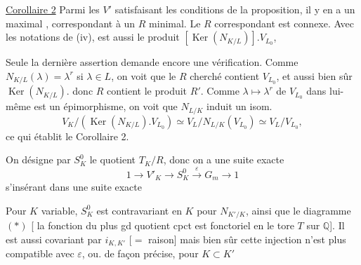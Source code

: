 \uline{Corollaire 2} Parmi les $V'$ satisfaisant les conditions de la proposition,
il y en a un maximal 
, correspondant à un $R$ minimal.
Le $R$ correspondant est connexe. Avec les notations de (iv),
est aussi le produit $[\operatorname{Ker}(N_{K/L})].V_{L_0}$,

Seule la dernière assertion demande encore une vérification.
Comme $N_{K/L}(\lambda)=\lambda^r$ si $\lambda\in L$, on voit que le $R$ cherché
contient $V_{L_0}$, et aussi bien sûr $\operatorname{Ker}(N_{K/L})$.
 donc $R$ contient le produit $R'$.
 Comme $\lambda\mapsto\lambda^r$ de $V_{L_0}$ dans lui-même est un épimorphisme,
on voit que $N_{L/K}$ induit un isom.
\[
V_K/(\operatorname{Ker}(N_{K/L}).V_{L_0})\simeq
V_L/N_{L/K}(V_{L_0})\simeq V_L/V_{L_0},
\]
ce qui établit le Corollaire 2.

On désigne par $S_K^0$ le quotient $T_K/R$, donc on a une suite exacte
\margin{\deleted{\unsure{$(*)$}}}
\[
1\longrightarrow V'_K\longrightarrow S_K^0\xrightarrow{\varepsilon}G_m\longrightarrow1
\]
s'insérant dans une suite exacte

Pour $K$ variable, $S_K^0$ est contravariant en $K$ pour $N_{K'/K}$,
ainsi que le diagramme $(*)$ [ la fonction du plus gd
quotient cpct est fonctoriel en le tore $T$ sur $\mathbb Q$].
Il est aussi covariant \deleted{\unsure{-}} par $i_{K,K'}$ [$=$ raison]
mais bien sûr cette injection n'est plus compatible avec $\varepsilon$,
ou. de façon précise, pour $K\subset K'$
